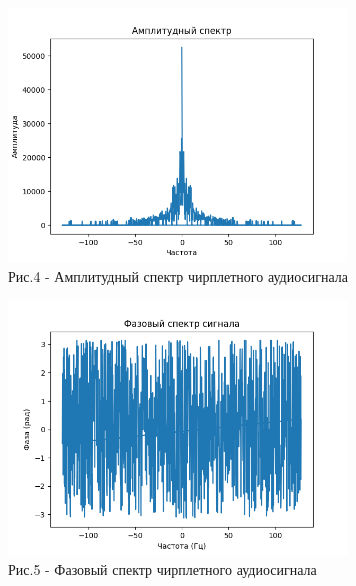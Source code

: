 \begin{figure}[H]
	\centering
	\includegraphics[width=0.8\textwidth]{media/ict/image67}
	\caption*{Рис.4 - Амплитудный спектр чирплетного аудиосигнала}
\end{figure}

\begin{figure}[H]
	\centering
	\includegraphics[width=0.8\textwidth]{media/ict/image68}
	\caption*{Рис.5 - Фазовый спектр чирплетного аудиосигнала}
\end{figure}

